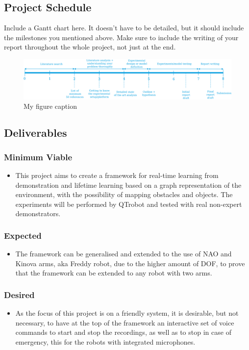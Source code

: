 \documentclass[thesis]{mas_proposal}
\begin{document}
\subsection{Project Schedule}
Include a Gantt chart here. It doesn't have to be detailed, but it should include the milestones you mentioned above.
Make sure to include the writing of your report throughout the whole project, not just at the end.

\begin{figure}[h!]
    \includegraphics[width=\textwidth]{images/rnd_deliverable_timeline}
    \caption{My figure caption}
    \label{fig:myfigure}
\end{figure}

\subsection{Deliverables}

\subsubsection*{Minimum Viable}
\begin{itemize}
    \item This project aims to create a framework for real-time learning from demonstration and lifetime learning based on a graph representation of the environment, with the possibility of mapping obstacles and objects. The experiments will be performed by QTrobot and tested with real non-expert demonstrators. 
\end{itemize}
\subsubsection*{Expected}
\begin{itemize}
    \item The framework can be generalised and extended to the use of NAO and Kinova arms, aka Freddy robot, due to the higher amount of DOF, to prove that the framework can be extended to any robot with two arms. 
\end{itemize}
\subsubsection*{Desired}
\begin{itemize}
    \item As the focus of this project is on a friendly system, it is desirable, but not necessary, to have at the top of the framework an interactive set of voice commands to start and stop the recordings, as well as to stop in case of emergency, this for the robots with integrated microphones.
\end{itemize}

\nocite{*}

\end{document}
